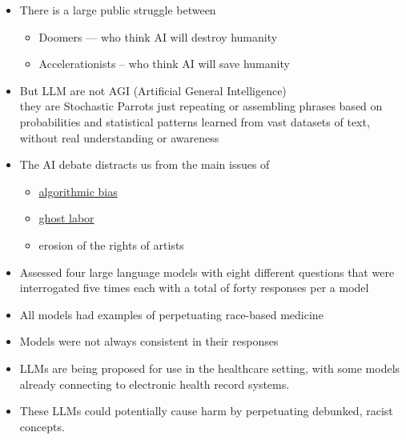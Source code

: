 \documentclass[25pt,a4paper,landscape,headrule,footrule,xetex]{foils}
\begin{document}

\begin{itemize}
\item There is a large public struggle between
  \begin{itemize}
  \item Doomers --- who think AI will destroy humanity
  \item Accelerationists -- who think AI will save humanity
  \end{itemize}
\item But LLM are not AGI (Artificial General Intelligence)
  \\ they are Stochastic Parrots just repeating or assembling phrases based on probabilities and statistical patterns learned from vast datasets of text, without real understanding or awareness \citep{10.1145/3442188.3445922}
\item The AI debate distracts us from the main issues of
  \begin{itemize}
  \item \href{https://en.wikipedia.org/wiki/Algorithmic_bias}{algorithmic bias}
  \item \href{https://en.wikipedia.org/wiki/Ghost_work}{ghost labor}
  \item erosion of the rights of artists
  \end{itemize}
\end{itemize}

\begin{itemize}
\item Assessed four large language models with eight different questions that were
interrogated five times each with a total of forty responses per a model
\item All models had examples
of perpetuating race-based medicine
\item Models were not always consistent in
their responses 
\item  LLMs are being proposed for use in the healthcare setting, with
some models already connecting to electronic health record systems. 
\item These LLMs could potentially cause harm by perpetuating debunked,
racist concepts. 
\end{itemize}

\end{document}
